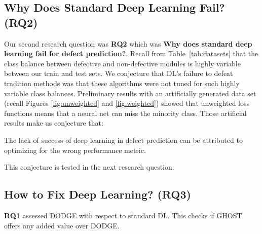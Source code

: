 \documentclass[10pt,compsoc,twocolumn]{IEEEtran}
\begin{document}
 
 \subsection{Why Does Standard Deep Learning Fail? ({\bf RQ2})}
 \label{sec:rq2}
Our second research question was  {\bf RQ2} which was 
 {\bf Why does standard deep learning fail for defect prediction?}.
 Recall from Table~\ref{tab:datasets} that the class balance    between defective and non-defective modules is highly variable between our train and test sets.
 We conjecture that DL's failure to defeat tradition methods was that these algorithms were not
 tuned for such highly variable class balances.  Preliminary results with an artificially generated data set (recall Figures \ref{fig:unweighted} and \ref{fig:weighted}) showed that  unweighted loss functions
 means that a neural net can miss the  minority class.
 Those artificial results
 make us conjecture that:

 \begin{blockquote}
     \noindent
     The  lack of success  of  deep  learning  in  defect prediction  can  be  attributed  to  optimizing  for  the wrong performance metric.
 \end{blockquote}

This conjecture is tested in the next research question.

\subsection{  How to Fix Deep Learning? {\bf (RQ3)}}
\label{sec:rq3}

{\bf RQ1} assessed DODGE with respect to  standard DL. This checks if    GHOST  offers any added value over DODGE.
 


\end{document}
